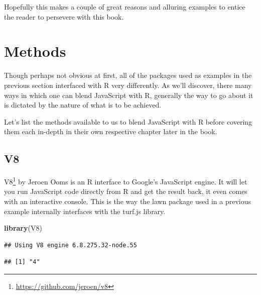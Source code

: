 \documentclass[
]{krantz}
\makeatletter
\newenvironment{Shaded}{\begin{snugshade}}{\end{snugshade}}
\newcommand{\CommentTok}[1]{\textcolor[rgb]{0.37,0.37,0.37}{\textit{#1}}}
\newcommand{\KeywordTok}[1]{\textcolor[rgb]{0.27,0.27,0.27}{\textbf{#1}}}
\newcommand{\NormalTok}[1]{#1}
\newcommand{\OperatorTok}[1]{\textcolor[rgb]{0.43,0.43,0.43}{\textbf{#1}}}
\newcommand{\StringTok}[1]{\textcolor[rgb]{0.5,0.5,0.5}{#1}}
\renewcommand{\href}[2]{#2\footnote{\url{#1}}}
\newenvironment{kframe}{%
\medskip{}
\setlength{\fboxsep}{.8em}
 \def\at@end@of@kframe{}%
 \ifinner\ifhmode%
  \def\at@end@of@kframe{\end{minipage}}%
  \begin{minipage}{\columnwidth}%
 \fi\fi%
 \def\FrameCommand##1{\hskip\@totalleftmargin \hskip-\fboxsep
 \colorbox{shadecolor}{##1}\hskip-\fboxsep
     \hskip-\linewidth \hskip-\@totalleftmargin \hskip\columnwidth}%
 \MakeFramed {\advance\hsize-\width
   \@totalleftmargin\z@ \linewidth\hsize
   \@setminipage}}%
 {\par\unskip\endMakeFramed%
 \at@end@of@kframe}
\renewenvironment{Shaded}{\begin{kframe}}{\end{kframe}}
\makeatother
\begin{document}
Hopefully this makes a couple of great reasons and alluring examples to entice the reader to persevere with this book.

\hypertarget{methods}{%
\section{Methods}\label{methods}}

Though perhaps not obvious at first, all of the packages used as examples in the previous section interfaced with R very differently. As we'll discover, there many ways in which one can blend JavaScript with R, generally the way to go about it is dictated by the nature of what is to be achieved.

Let's list the methods available to us to blend JavaScript with R before covering them each in-depth in their own respective chapter later in the book.

\hypertarget{v8}{%
\subsection{V8}\label{v8}}

\href{https://github.com/jeroen/v8}{V8} by Jeroen Ooms is an R interface to Google's JavaScript engine. It will let you run JavaScript code directly from R and get the result back, it even comes with an interactive console. This is the way the lawn package used in a previous example internally interfaces with the turf.js library.

\begin{Shaded}
\begin{Highlighting}[]
\KeywordTok{library}\NormalTok{(V8)}
\end{Highlighting}
\end{Shaded}

\begin{verbatim}
## Using V8 engine 6.8.275.32-node.55
\end{verbatim}

\begin{Shaded}
\end{Shaded}

\begin{verbatim}
## [1] "4"
\end{verbatim}
\end{document}
